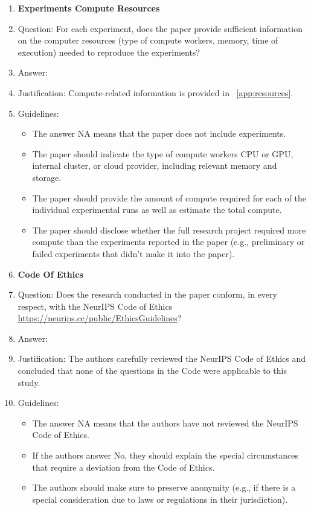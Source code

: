 \documentclass{article}
\begin{document}
\begin{enumerate}
\item {\bf Experiments Compute Resources}
    \item[] Question: For each experiment, does the paper provide sufficient information on the computer resources (type of compute workers, memory, time of execution) needed to reproduce the experiments?
    \item[] Answer: \answerYes{} %
    \item[] Justification:  Compute-related information is provided in ~\ref{app:resources}.
    \item[] Guidelines:
    \begin{itemize}
        \item The answer NA means that the paper does not include experiments.
        \item The paper should indicate the type of compute workers CPU or GPU, internal cluster, or cloud provider, including relevant memory and storage.
        \item The paper should provide the amount of compute required for each of the individual experimental runs as well as estimate the total compute. 
        \item The paper should disclose whether the full research project required more compute than the experiments reported in the paper (e.g., preliminary or failed experiments that didn't make it into the paper). 
    \end{itemize}

\item {\bf Code Of Ethics}
    \item[] Question: Does the research conducted in the paper conform, in every respect, with the NeurIPS Code of Ethics \url{https://neurips.cc/public/EthicsGuidelines}?
    \item[] Answer: \answerNA{} %
    \item[] Justification: The authors carefully reviewed the NeurIPS Code of Ethics and concluded that none of the questions in the Code were applicable to this study.
    \item[] Guidelines:
    \begin{itemize}
        \item The answer NA means that the authors have not reviewed the NeurIPS Code of Ethics.
        \item If the authors answer No, they should explain the special circumstances that require a deviation from the Code of Ethics.
        \item The authors should make sure to preserve anonymity (e.g., if there is a special consideration due to laws or regulations in their jurisdiction).
    \end{itemize}


\end{enumerate}
\end{document}
